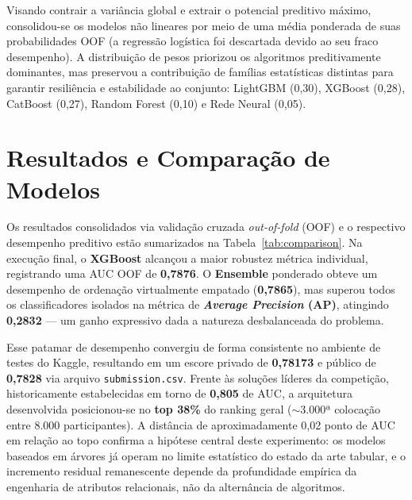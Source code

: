 \documentclass[10pt,a4paper]{article}
\begin{document}
Visando contrair a variância global e extrair o potencial preditivo máximo, consolidou-se os modelos não lineares por meio de uma média ponderada de suas probabilidades OOF (a regressão logística foi descartada devido ao seu fraco desempenho). A distribuição de pesos priorizou os algoritmos preditivamente dominantes, mas preservou a contribuição de famílias estatísticas distintas para garantir resiliência e estabilidade ao conjunto: LightGBM (0,30), XGBoost (0,28), CatBoost (0,27), Random Forest (0,10) e Rede Neural (0,05).

\section{Resultados e Comparação de Modelos}
Os resultados consolidados via validação cruzada \textit{out-of-fold} (OOF) e o respectivo desempenho preditivo estão sumarizados na Tabela~\ref{tab:comparison}. Na execução final, o \textbf{XGBoost} alcançou a maior robustez métrica individual, registrando uma AUC OOF de \textbf{0,7876}. O \textbf{Ensemble} ponderado obteve um desempenho de ordenação virtualmente empatado (\textbf{0,7865}), mas superou todos os classificadores isolados na métrica de \textbf{\textit{Average Precision} (AP)}, atingindo \textbf{0,2832} --- um ganho expressivo dada a natureza desbalanceada do problema.

Esse patamar de desempenho convergiu de forma consistente no ambiente de testes do Kaggle, resultando em um escore privado de \textbf{0,78173} e público de \textbf{0,7828} via arquivo \texttt{submission.csv}. Frente às soluções líderes da competição, historicamente estabelecidas em torno de \textbf{0,805} de AUC, a arquitetura desenvolvida posicionou-se no \textbf{top 38\%} do ranking geral ($\sim$3.000ª colocação entre 8.000 participantes). A distância de aproximadamente 0,02 ponto de AUC em relação ao topo confirma a hipótese central deste experimento: os modelos baseados em árvores já operam no limite estatístico do estado da arte tabular, e o incremento residual remanescente depende da profundidade empírica da engenharia de atributos relacionais, não da alternância de algoritmos.
\end{document}
